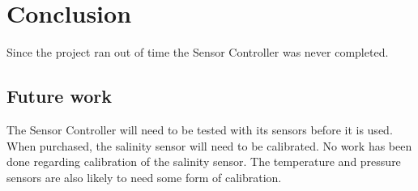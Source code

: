 
\section{Conclusion}\label{sec:conclusion}
Since the project ran out of time the Sensor Controller was never completed.

\subsection{Future work}
The Sensor Controller will need to be tested with its sensors before it is used. \\
When purchased, the salinity sensor will need to be calibrated. No work has been done regarding calibration of the salinity sensor. The temperature and pressure sensors are also likely to need some form of calibration.

